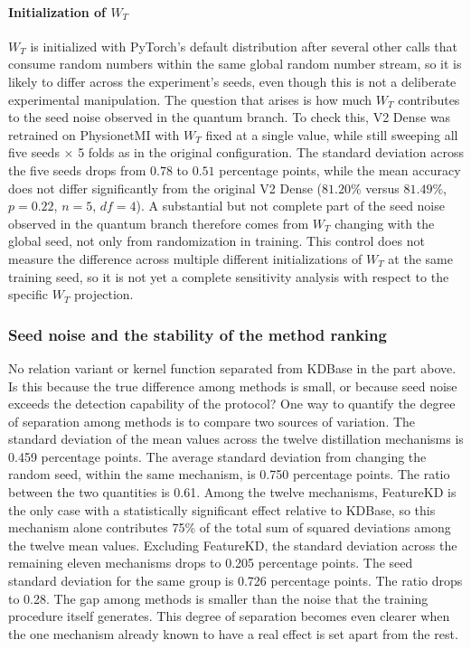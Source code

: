 \paragraph{Initialization of $W_T$}

$W_T$ is initialized with PyTorch's default distribution after
several other calls that consume random numbers within the same
global random number stream, so it is likely to differ across the
experiment's seeds, even though this is not a deliberate
experimental manipulation. The question that arises is how much
$W_T$ contributes to the seed noise observed in the quantum branch.
To check this, V2 Dense was retrained on PhysionetMI with $W_T$
fixed at a single value, while still sweeping all five seeds
$\times$ 5 folds as in the original configuration. The standard
deviation across the five seeds drops from $0.78$ to $0.51$
percentage points, while the mean accuracy does not differ
significantly from the original V2 Dense ($81.20\%$ versus
$81.49\%$, $p = 0.22$, $n=5$, $df=4$). A substantial but not
complete part of the seed noise observed in the quantum branch
therefore comes from $W_T$ changing with the global seed, not only
from randomization in training. This control does not measure the
difference across multiple different initializations of $W_T$ at
the same training seed, so it is not yet a complete sensitivity
analysis with respect to the specific $W_T$ projection.

\subsubsection{Seed noise and the stability of the method ranking}
\label{sec:xephang}

No relation variant or kernel function separated from KDBase in the
part above. Is this because the true difference among methods is
small, or because seed noise exceeds the detection capability of the
protocol? One way to quantify the degree of separation among methods
is to compare two sources of variation. The standard deviation of
the mean values across the twelve distillation mechanisms is 0.459
percentage points. The average standard deviation from changing the
random seed, within the same mechanism, is 0.750 percentage points.
The ratio between the two quantities is 0.61. Among the twelve
mechanisms, FeatureKD is the only case with a statistically
significant effect relative to KDBase, so this mechanism alone
contributes 75\% of the total sum of squared deviations among the
twelve mean values. Excluding FeatureKD, the standard deviation
across the remaining eleven mechanisms drops to 0.205 percentage
points. The seed standard deviation for the same group is 0.726
percentage points. The ratio drops to 0.28. The gap among methods is
smaller than the noise that the training procedure itself generates.
This degree of separation becomes even clearer when the one
mechanism already known to have a real effect is set apart from the
rest.

